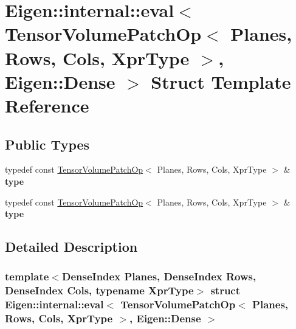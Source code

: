 \hypertarget{struct_eigen_1_1internal_1_1eval_3_01_tensor_volume_patch_op_3_01_planes_00_01_rows_00_01_cols_0fbbbfea9d11ccf46d4c751aec1ba44e4}{}\section{Eigen\+:\+:internal\+:\+:eval$<$ Tensor\+Volume\+Patch\+Op$<$ Planes, Rows, Cols, Xpr\+Type $>$, Eigen\+:\+:Dense $>$ Struct Template Reference}
\label{struct_eigen_1_1internal_1_1eval_3_01_tensor_volume_patch_op_3_01_planes_00_01_rows_00_01_cols_0fbbbfea9d11ccf46d4c751aec1ba44e4}
\subsection*{Public Types}
\begin{DoxyCompactItemize}
\item 
\mbox{\label{struct_eigen_1_1internal_1_1eval_3_01_tensor_volume_patch_op_3_01_planes_00_01_rows_00_01_cols_0fbbbfea9d11ccf46d4c751aec1ba44e4_a54106f5d14855e901ab0457b5f581f03}} 
typedef const \hyperlink{class_eigen_1_1_tensor_volume_patch_op}{Tensor\+Volume\+Patch\+Op}$<$ Planes, Rows, Cols, Xpr\+Type $>$ \& {\bfseries type}
\item 
\mbox{\label{struct_eigen_1_1internal_1_1eval_3_01_tensor_volume_patch_op_3_01_planes_00_01_rows_00_01_cols_0fbbbfea9d11ccf46d4c751aec1ba44e4_a54106f5d14855e901ab0457b5f581f03}} 
typedef const \hyperlink{class_eigen_1_1_tensor_volume_patch_op}{Tensor\+Volume\+Patch\+Op}$<$ Planes, Rows, Cols, Xpr\+Type $>$ \& {\bfseries type}
\end{DoxyCompactItemize}


\subsection{Detailed Description}
\subsubsection*{template$<$Dense\+Index Planes, Dense\+Index Rows, Dense\+Index Cols, typename Xpr\+Type$>$\newline
struct Eigen\+::internal\+::eval$<$ Tensor\+Volume\+Patch\+Op$<$ Planes, Rows, Cols, Xpr\+Type $>$, Eigen\+::\+Dense $>$}




